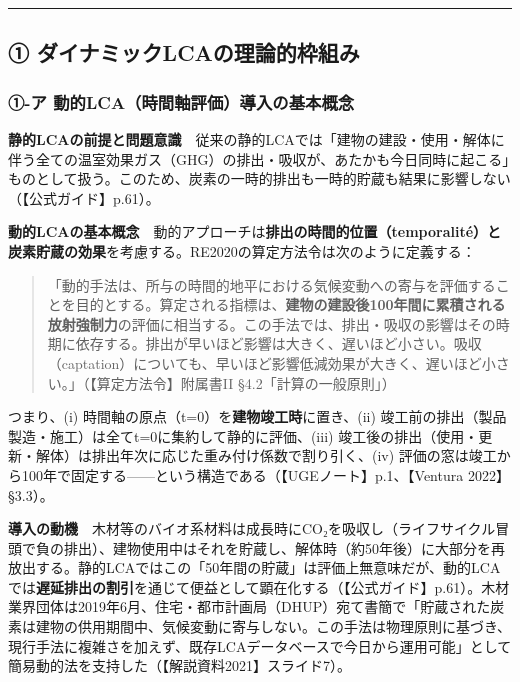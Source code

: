 \documentclass[11pt]{article}
\begin{document}
\begin{center}\rule{0.5\linewidth}{0.5pt}\end{center}

\hypertarget{ux2460-ux30c0ux30a4ux30caux30dfux30c3ux30aflcaux306eux7406ux8ad6ux7684ux67a0ux7d44ux307f}{%
\subsection{①
ダイナミックLCAの理論的枠組み}\label{ux2460-ux30c0ux30a4ux30caux30dfux30c3ux30aflcaux306eux7406ux8ad6ux7684ux67a0ux7d44ux307f}}

\hypertarget{ux2460-ux30a2-ux52d5ux7684lcaux6642ux9593ux8ef8ux8a55ux4fa1ux5c0eux5165ux306eux57faux672cux6982ux5ff5}{%
\subsubsection{①-ア
動的LCA（時間軸評価）導入の基本概念}\label{ux2460-ux30a2-ux52d5ux7684lcaux6642ux9593ux8ef8ux8a55ux4fa1ux5c0eux5165ux306eux57faux672cux6982ux5ff5}}

\textbf{静的LCAの前提と問題意識}　従来の静的LCAでは「建物の建設・使用・解体に伴う全ての温室効果ガス（GHG）の排出・吸収が、あたかも今日同時に起こる」ものとして扱う。このため、炭素の一時的排出も一時的貯蔵も結果に影響しない（【公式ガイド】p.61）。

\textbf{動的LCAの基本概念}　動的アプローチは\textbf{排出の時間的位置（temporalité）と炭素貯蔵の効果}を考慮する。RE2020の算定方法令は次のように定義する：

\begin{quote}
「動的手法は、所与の時間的地平における気候変動への寄与を評価することを目的とする。算定される指標は、\textbf{建物の建設後100年間に累積される放射強制力}の評価に相当する。この手法では、排出・吸収の影響はその時期に依存する。排出が早いほど影響は大きく、遅いほど小さい。吸収（captation）についても、早いほど影響低減効果が大きく、遅いほど小さい。」（【算定方法令】附属書II
§4.2「計算の一般原則」）
\end{quote}

つまり、(i) 時間軸の原点（t=0）を\textbf{建物竣工時}に置き、(ii)
竣工前の排出（製品製造・施工）は全てt=0に集約して静的に評価、(iii)
竣工後の排出（使用・更新・解体）は排出年次に応じた重み付け係数で割り引く、(iv)
評価の窓は竣工から100年で固定する------という構造である（【UGEノート】p.1、【Ventura
2022】§3.3）。

\textbf{導入の動機}　木材等のバイオ系材料は成長時にCO₂を吸収し（ライフサイクル冒頭で負の排出）、建物使用中はそれを貯蔵し、解体時（約50年後）に大部分を再放出する。静的LCAではこの「50年間の貯蔵」は評価上無意味だが、動的LCAでは\textbf{遅延排出の割引}を通じて便益として顕在化する（【公式ガイド】p.61）。木材業界団体は2019年6月、住宅・都市計画局（DHUP）宛て書簡で「貯蔵された炭素は建物の供用期間中、気候変動に寄与しない。この手法は物理原則に基づき、現行手法に複雑さを加えず、既存LCAデータベースで今日から運用可能」として簡易動的法を支持した（【解説資料2021】スライド7）。
\end{document}
